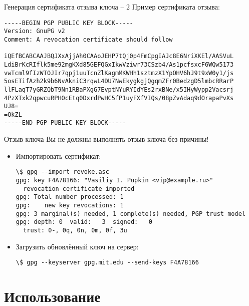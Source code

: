 \documentclass[presentation]{beamer}
\begin{document}
\begin{frame}[fragile]{Генерация сертификата отзыва ключа -- 2}
  Пример сертификата отзыва:\newline
\footnotesize
\begin{Verbatim}[commandchars=\\\[\]]
-----BEGIN PGP PUBLIC KEY BLOCK-----
Version: GnuPG v2
Comment: A revocation certificate should follow

iQEfBCABCAAJBQJXxAjjAh0CAAoJEHP7tQj0p4FmCpgIAJc8E6NriXKEl/AASVuL
LdiBrKcRIflk5me92mgKXd85GEFQGxIkwVziwr73CSzb4/As1pcfsxcF6WQw5173
vwTcml9fIzWTOJIr7qpj1uuTcnZlKagmMKWHh1sztmzX1YpOHV6hJ9t9xW0y1/js
5osETifAzh2k9b6NvAkniC3rqwL4DU7NwEkygkgjQgqmZFr0BedzgD5lmbcRRarP
llFLaqT7yGRZQbT9Nn1RBaPXgG7EvptNYuRYIdYEs2rxBNe/x5IHyWypp2Vacsrj
4PzXTxk2qpwcuRPHOcEtq0DxrdPwHC5fP1uyFXfVIQs/08pZvAdaq9dOrapaPvXs
UJ8=
=OkZL
-----END PGP PUBLIC KEY BLOCK-----
\end{Verbatim}
\normalsize
\end{frame}

\begin{frame}[fragile]{Отзыв ключа}
  \alert{Вы не должны выполнять отзыв ключа без причины!}\newline

  \begin{itemize}
  \item Импортировать сертификат:
    \footnotesize
\begin{Verbatim}[commandchars=\\\[\]]
\$ gpg --import revoke.asc
gpg: key F4A78166: "Vasiliy I. Pupkin <vip@example.ru>"
  revocation certificate imported
gpg: Total number processed: 1
gpg:    new key revocations: 1
gpg: 3 marginal(s) needed, 1 complete(s) needed, PGP trust model
gpg: depth: 0  valid:   3  signed:   0
  trust: 0-, 0q, 0n, 0m, 0f, 3u
\end{Verbatim}
    \normalsize
  \item Загрузить обновлённый ключ на сервер:
    \footnotesize
\begin{Verbatim}[commandchars=\\\[\]]
\$ gpg --keyserver gpg.mit.edu --send-keys F4A78166
\end{Verbatim}
    \normalsize
  \end{itemize}
\end{frame}



\section{Использование}
\end{document}
